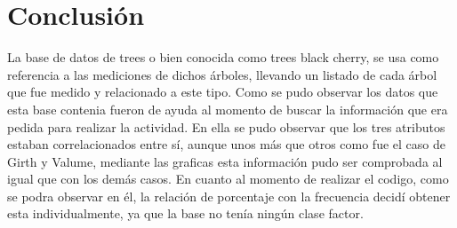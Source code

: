 \documentclass[12pt,a4paper]{article}
\begin{document}
\section{Conclusión}
La base de datos de trees o bien conocida como trees black cherry, se usa como referencia a las mediciones de dichos árboles, llevando un listado de cada árbol que fue medido y relacionado a este tipo. Como se pudo observar los datos que esta base contenia fueron de ayuda al momento de buscar la información que era pedida para realizar la actividad. En ella se pudo observar que los tres atributos estaban correlacionados entre sí, aunque unos más que otros como fue el caso de Girth y Valume, mediante las graficas esta información pudo ser comprobada al igual que con los demás casos. En cuanto al momento de realizar el codigo, como se podra observar en él, la relación de porcentaje con la frecuencia decidí obtener esta individualmente, ya que la base no tenía ningún clase factor. \citep{handbook}

\newpage


\end{document}
